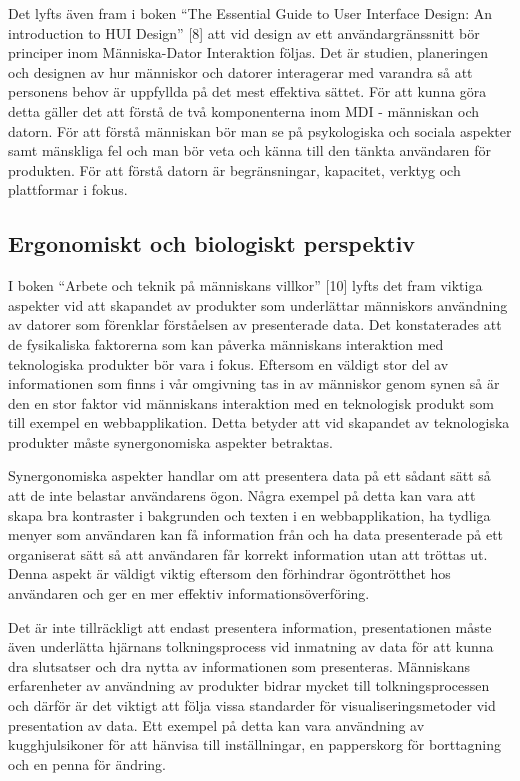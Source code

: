 \documentclass[12pt]{kththesis}
\begin{document}
Det lyfts även fram i boken “The Essential Guide to User Interface Design: An introduction to HUI Design” [8] att vid design av ett användargränssnitt bör principer inom Människa-Dator Interaktion följas. Det är studien, planeringen och designen av hur människor och datorer interagerar med varandra så att personens behov är uppfyllda på det mest effektiva sättet. För att kunna göra detta gäller det att förstå de två komponenterna inom MDI - människan och datorn. För att förstå människan bör man se på psykologiska och sociala aspekter samt mänskliga fel och man bör veta och känna till den tänkta användaren för produkten. För att förstå datorn är begränsningar, kapacitet, verktyg och plattformar i fokus.

\subsection{Ergonomiskt och biologiskt perspektiv}

I boken “Arbete och teknik på människans villkor” [10] lyfts det fram viktiga aspekter vid att skapandet av produkter som underlättar människors användning av datorer som förenklar förståelsen av presenterade data. Det konstaterades att de fysikaliska faktorerna som kan påverka människans interaktion med teknologiska produkter bör vara i fokus. Eftersom en väldigt stor del av informationen som finns i vår omgivning tas in av människor genom synen så är den en stor faktor vid människans interaktion med en teknologisk produkt som till exempel en webbapplikation. Detta betyder att vid skapandet av teknologiska produkter måste synergonomiska aspekter betraktas. 

Synergonomiska aspekter handlar om att presentera data på ett sådant sätt så att de inte belastar användarens ögon. Några exempel på detta kan vara att skapa bra kontraster i bakgrunden och texten i en webbapplikation, ha tydliga menyer som användaren kan få information från och ha data presenterade på ett organiserat sätt så att användaren får korrekt information utan att tröttas ut. Denna aspekt är väldigt viktig eftersom den förhindrar ögontrötthet hos användaren och ger en mer effektiv informationsöverföring. 

Det är inte tillräckligt att endast presentera information, presentationen måste även underlätta hjärnans tolkningsprocess vid inmatning av data för att kunna dra slutsatser och dra nytta av informationen som presenteras. Människans erfarenheter av användning av produkter bidrar mycket till tolkningsprocessen och därför är det viktigt att följa vissa standarder för visualiseringsmetoder vid presentation av data. Ett exempel på detta kan vara användning av kugghjulsikoner för att hänvisa till inställningar, en papperskorg för borttagning och en penna för ändring. 
\end{document}
